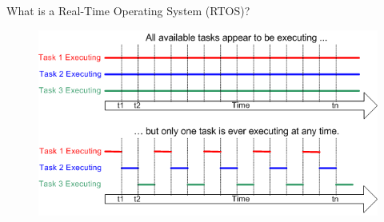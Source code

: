 \documentclass[10pt]{beamer}
\begin{document}
\begin{frame}{What is a Real-Time Operating System (RTOS)?}
    \begin{figure}[h]
      \centering
      \includegraphics[width=1.0\textwidth]{figures/Timing.png}
      \label{fig:my_label}
    \end{figure}
\end{frame}
\end{document}
